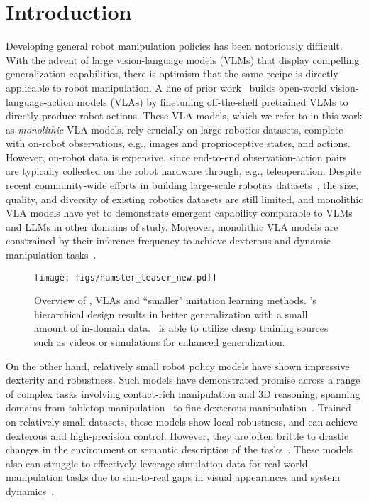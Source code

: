 \section{Introduction}
\begingroup
\renewcommand{\thefootnote}{}
\endgroup
Developing general robot manipulation policies has been notoriously difficult. With the advent of large vision-language models (VLMs) that display compelling generalization capabilities, there is optimism that the same recipe is directly applicable to robot manipulation. A line of prior work~\citep{rt22023arxiv,kim2024openvla,black2024pi0} builds open-world vision-language-action models (VLAs) by finetuning off-the-shelf pretrained VLMs to directly produce robot actions. These VLA models, which we refer to in this work as \emph{monolithic} VLA models, rely crucially on large robotics datasets, complete with on-robot observations, e.g., images and proprioceptive states, and actions. However, on-robot data is expensive, since end-to-end observation-action pairs are typically collected on the robot hardware through, e.g., teleoperation. Despite recent community-wide efforts in building large-scale robotics datasets~\citep{open_x_embodiment_rt_x_2023,khazatsky2024droid}, the size, quality, and diversity of existing robotics datasets are still limited, and monolithic VLA models have yet to demonstrate emergent capability comparable to VLMs and LLMs in other domains of study. Moreover, monolithic VLA models are constrained by their inference frequency to achieve dexterous and dynamic manipulation tasks~\citep{rt22023arxiv, kim2024openvla}.

\begin{figure*}[t]
    \centering
    \texttt{[image: figs/hamster\_teaser\_new.pdf]}
    \caption{\footnotesize{Overview of \method, VLAs and ``smaller" imitation learning methods. \method 's hierarchical design results in better generalization with a small amount of in-domain data. \method\ is able to utilize cheap training sources such as videos or simulations for enhanced generalization.}}
    \label{fig:teaser}
\vspace{-4mm}
\end{figure*}

On the other hand, relatively small robot policy models have shown impressive dexterity and %
robustness. Such models have demonstrated promise across a range of complex tasks involving contact-rich manipulation and 3D reasoning, spanning domains from tabletop manipulation~\citep{shridhar2023perceiver,goyal2023rvt,goyal2024rvt,ke20243d} to fine dexterous manipulation~\citep{chi23diffusion,zhao23aloha}. Trained on relatively small datasets, these models show local robustness, and can achieve dexterous and high-precision control. However, they are often brittle to drastic changes in the environment or semantic description of the tasks~\citep{pumacay2024colosseum}. These models also can struggle to effectively leverage simulation data for real-world manipulation tasks due to sim-to-real gaps in visual appearances and system dynamics~\citep{li2024evaluating, robomimic2021}.

